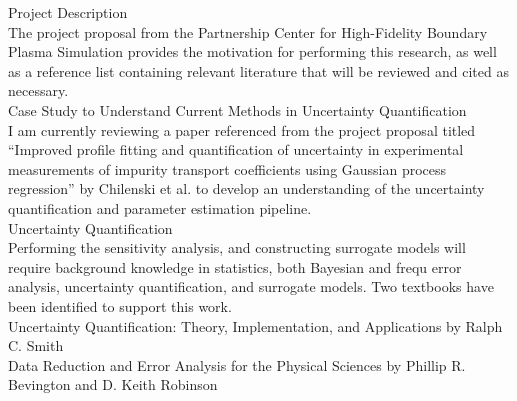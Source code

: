 \documentclass{article}
\begin{document}
Project Description\\
The project proposal from the Partnership Center for High-Fidelity Boundary Plasma Simulation provides the motivation for performing this research, as well as a reference list containing relevant literature that will be reviewed and cited as necessary. \\
Case Study to Understand Current Methods in Uncertainty Quantification\\
I am currently reviewing a paper referenced from the project proposal titled “Improved profile fitting and quantification of uncertainty in experimental measurements of impurity transport coefficients using Gaussian process regression” by Chilenski et al. to develop an understanding of the uncertainty quantification and parameter estimation pipeline.\\
Uncertainty Quantification\\
Performing the sensitivity analysis, and constructing surrogate models will require background knowledge in statistics, both Bayesian and frequ error analysis, uncertainty quantification, and surrogate models. Two textbooks have been identified to support this work.\\
Uncertainty Quantification: Theory, Implementation, and Applications by Ralph C. Smith\\
Data Reduction and Error Analysis for the Physical Sciences by Phillip R. Bevington and D. Keith Robinson\\

\newpage


\end{document}
